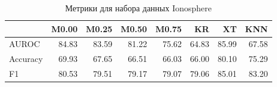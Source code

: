 \begin{table}
\caption{Метрики для набора данных Ionosphere}
\label{tab:Ionosphere}
\begin{tabular}{lrrrrrrr}
\toprule
 & M0.00 & M0.25 & M0.50 & M0.75 & KR & XT & KNN \\
\midrule
AUROC & 84.83 & 83.59 & 81.22 & 75.62 & 64.83 & 85.99 & 67.58 \\
Accuracy & 69.93 & 67.65 & 66.51 & 66.03 & 66.00 & 80.10 & 75.29 \\
F1 & 80.53 & 79.51 & 79.17 & 79.07 & 79.06 & 85.01 & 83.20 \\
\bottomrule
\end{tabular}
\end{table}
